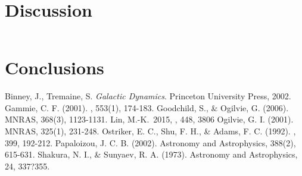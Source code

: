 \documentclass[apj]{emulateapj}
\begin{document}
\section{Discussion}

\begin{equation}

\end{equation}





\section{Conclusions}

\begin{thebibliography}{}
 Binney, J., Tremaine, S. \emph{Galactic Dynamics}. Princeton University Press, 2002.
 Gammie, C. F. (2001). \apj, 553(1), 174-183. 
 Goodchild, S., \& Ogilvie, G. (2006). MNRAS, 368(3), 1123-1131. 
 Lin, M.-K.\ 2015, \mnras, 448, 3806  Ogilvie, G. I. (2001). MNRAS, 325(1), 231-248. 
 Ostriker, E. C., Shu, F. H., \& Adams, F. C. (1992). \apj, 399, 192-212. 
 Papaloizou, J. C. B. (2002). Astronomy and Astrophysics, 388(2), 615-631. 
 Shakura, N. I., \& Sunyaev, R. A. (1973). Astronomy and Astrophysics, 24, 337?355.
\end{thebibliography}
\end{document}
